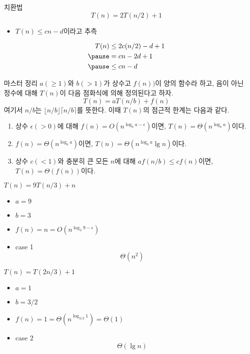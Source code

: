 \documentclass[10pt]{beamer}
\begin{document}
\begin{frame}{치환법}
    $$T(n) = 2T(n/2) + 1$$
    \begin{itemize}
        \item $T(n) \le cn - d$이라고 추측
    \end{itemize}
    \[
        \begin{aligned}
           T(n) &\le 2c(n/2)-d +1 \\ \pause
            &= cn -2d + 1 \\ \pause
            &\le cn - d
        \end{aligned}
    \]
\end{frame}


\begin{frame}{마스터 정리}
    $a(\ge 1)$와 $b(> 1)$가 상수고 $f(n))$이 양의 함수라 하고, 음이 아닌 정수에 대해 $T(n)$이 다음 점화식에 의해 정의된다고 하자.
    $$T(n) = aT(n/b) + f(n)$$
    여기서 $n/b$는 $\lfloor n/b \rfloor \lceil n/b \rceil$를 뜻한다. 이때 $T(n)$의 점근적 한계는 다음과 같다.
    \begin{enumerate}
        \item 상수 $\epsilon(>0)$에 대해 $f(n) = O(n^{\log_b a-\epsilon})$이면, $T(n) = \Theta(n^{\log_b a})$이다.
        \item $f(n) = \Theta(n^{\log_b a})$이면, $T(n) = \Theta(n^{\log_b a} \lg n)$이다.
        \item 상수 $c(<1)$와 충분히 큰 모든 $n$에 대해 $af(n/b) \le cf(n)$이면, $T(n) = \Theta(f(n))$이다.
    \end{enumerate}
\end{frame}



\begin{frame}{ex}
    $T(n) = 9T(n/3) + n$ \pause
    \begin{itemize}
        \item $a = 9$ \pause
        \item $b = 3$ \pause
        \item $f(n) = n = O(n ^{\log _3 9 - \epsilon})$ \pause
        \item case 1 \pause
        $$\Theta(n^2)$$
    \end{itemize}
     $T(n) = T(2n/3) + 1$ \pause
     \begin{itemize}
         \item $a = 1$ \pause
         \item $b = 3/2$ \pause
         \item $f(n) = 1 = \Theta(n ^{\log _{3/2}1}) = \Theta(1)$ \pause
        \item case 2 \pause
        $$\Theta(\lg n)$$
    \end{itemize}
\end{frame}
\end{document}
